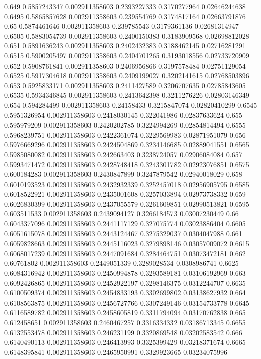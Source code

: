 {0.649 0.5857243347 0.002911358603 0.2393227333 0.3170277964 0.02646244638
0.6495 0.5865857628 0.002911358603 0.239554769 0.3174817164 0.02663791876
0.65 0.5874461646 0.002911358603 0.239785543 0.3179361136 0.02681314947
0.6505 0.5883054739 0.002911358603 0.2400150383 0.3183909568 0.02698812028
0.651 0.5891636243 0.002911358603 0.2402432383 0.3188462145 0.02716281291
0.6515 0.5900205497 0.002911358603 0.2404701265 0.3193018556 0.02733720909
0.652 0.5908761841 0.002911358603 0.2406956866 0.3197578484 0.02751129054
0.6525 0.5917304618 0.002911358603 0.2409199027 0.3202141615 0.02768503896
0.653 0.5925833171 0.002911358603 0.2411427589 0.3206707635 0.02785843605
0.6535 0.5934346845 0.002911358603 0.2413642398 0.3211276226 0.02803146349
0.654 0.594284499 0.002911358603 0.24158433 0.3215847074 0.02820410299
0.6545 0.5951326954 0.002911358603 0.2418030145 0.322041986 0.02837633624
0.655 0.595979209 0.002911358603 0.2420202785 0.3224994269 0.02854814494
0.6555 0.5968239751 0.002911358603 0.2422361074 0.3229569983 0.02871951079
0.656 0.5976669296 0.002911358603 0.2424504869 0.3234146685 0.02889041551
0.6565 0.5985080082 0.002911358603 0.242663403 0.3238724057 0.02906084084
0.657 0.5993471472 0.002911358603 0.2428748418 0.3243301782 0.02923076851
0.6575 0.600184283 0.002911358603 0.2430847899 0.3247879542 0.02940018029
0.658 0.6010193523 0.002911358603 0.2432932339 0.3252457018 0.02956905795
0.6585 0.6018522921 0.002911358603 0.2435001608 0.3257033894 0.02973738332
0.659 0.6026830399 0.002911358603 0.2437055579 0.3261609851 0.02990513821
0.6595 0.603511533 0.002911358603 0.2439094127 0.3266184573 0.03007230449
0.66 0.6043377096 0.002911358603 0.2441117129 0.327075774 0.03023886404
0.6605 0.6051615078 0.002911358603 0.2443124467 0.3275329037 0.0304047988
0.661 0.6059828663 0.002911358603 0.2445116023 0.3279898146 0.03057009072
0.6615 0.6068017239 0.002911358603 0.2447091684 0.3284464751 0.03073472181
0.662 0.60761802 0.002911358603 0.2449051339 0.3289028534 0.0308986741
0.6625 0.6084316942 0.002911358603 0.2450994878 0.3293589181 0.03106192969
0.663 0.6092426865 0.002911358603 0.2452922197 0.3298146375 0.0312244707
0.6635 0.6100509374 0.002911358603 0.2454833193 0.3302699802 0.03138627932
0.664 0.6108563875 0.002911358603 0.2456727766 0.3307249146 0.03154733778
0.6645 0.6116589782 0.002911358603 0.2458605819 0.3311794094 0.03170762838
0.665 0.612458651 0.002911358603 0.2460467257 0.3316334332 0.03186713345
0.6655 0.6132553478 0.002911358603 0.246231199 0.3320869548 0.03202583542
0.666 0.6140490113 0.002911358603 0.246413993 0.3325399429 0.03218371674
0.6665 0.6148395841 0.002911358603 0.2465950991 0.3329923665 0.03234075996
}
